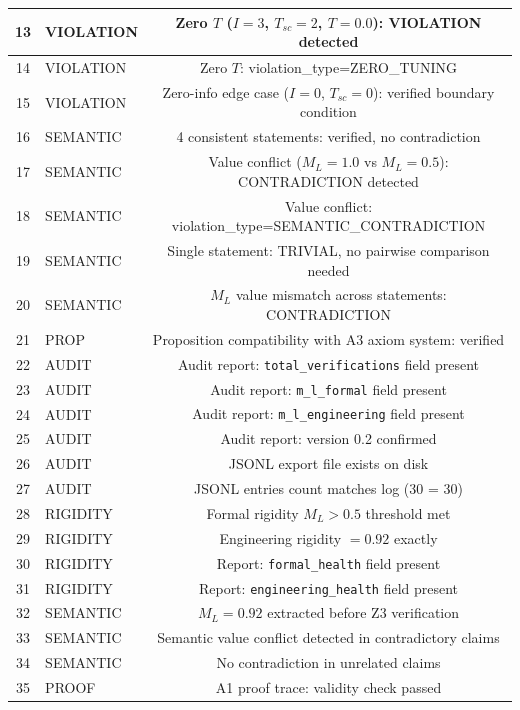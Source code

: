 \documentclass[11pt,a4paper]{article}
\begin{document}
\begin{longtable}{|c|l|c|}
\hline
13 & VIOLATION & Zero $T$ ($I=3$, $T_{sc}=2$, $T=0.0$): VIOLATION detected \\
\hline
14 & VIOLATION & Zero $T$: violation\_type=ZERO\_TUNING \\
\hline
15 & VIOLATION & Zero-info edge case ($I=0$, $T_{sc}=0$): verified boundary condition \\
\hline
16 & SEMANTIC & 4 consistent statements: verified, no contradiction \\
\hline
17 & SEMANTIC & Value conflict ($M_L=1.0$ vs $M_L=0.5$): CONTRADICTION detected \\
\hline
18 & SEMANTIC & Value conflict: violation\_type=SEMANTIC\_CONTRADICTION \\
\hline
19 & SEMANTIC & Single statement: TRIVIAL, no pairwise comparison needed \\
\hline
20 & SEMANTIC & $M_L$ value mismatch across statements: CONTRADICTION \\
\hline
21 & PROP & Proposition compatibility with A3 axiom system: verified \\
\hline
22 & AUDIT & Audit report: \texttt{total\_verifications} field present \\
\hline
23 & AUDIT & Audit report: \texttt{m\_l\_formal} field present \\
\hline
24 & AUDIT & Audit report: \texttt{m\_l\_engineering} field present \\
\hline
25 & AUDIT & Audit report: version 0.2 confirmed \\
\hline
26 & AUDIT & JSONL export file exists on disk \\
\hline
27 & AUDIT & JSONL entries count matches log (30 = 30) \\
\hline
28 & RIGIDITY & Formal rigidity $M_L > 0.5$ threshold met \\
\hline
29 & RIGIDITY & Engineering rigidity $= 0.92$ exactly \\
\hline
30 & RIGIDITY & Report: \texttt{formal\_health} field present \\
\hline
31 & RIGIDITY & Report: \texttt{engineering\_health} field present \\
\hline
32 & SEMANTIC & $M_L=0.92$ extracted before Z3 verification \\
\hline
33 & SEMANTIC & Semantic value conflict detected in contradictory claims \\
\hline
34 & SEMANTIC & No contradiction in unrelated claims \\
\hline
35 & PROOF & A1 proof trace: validity check passed \\

\end{longtable}
\end{document}
